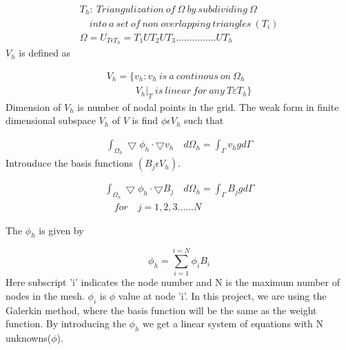 \documentclass[12pt]{elsarticle}
\begin{document}
	\begin{equation}
		\begin{gathered}
			T_h:\ Triangulization\ of\ \Omega\ by\ subdividing\ \Omega\\
			\quad into\ a\ set\ of\ non\ overlapping\ triangles\ (T_i)\\
			\Omega=U_{T\epsilon T_h}=T_1 U T_2 U T_3...............UT_h
		\end{gathered}
	\end{equation}
	$V_h$ is defined as 
	
	\begin{equation}
		\begin{gathered}
			V_h=\{v_h:v_h\ is\ a\ continous\ on\ \Omega_h \\
			\quad \quad \quad V_h|_T\ is\ linear\ for\ any\ T\varepsilon T_h \}
		\end{gathered}
	\end{equation}
	Dimension of $V_h$ is number of nodal points in the grid. The weak form in finite dimensional subspace $V_h$ of $V$
	is find $\phi \epsilon V_h$ such that 
	
	\begin{equation}
		\begin{gathered}
			\int_{{\Omega}_h} \bigtriangledown \phi_h \cdot \bigtriangledown v_h \quad d \Omega_h =\int_{\Gamma} v_h g d \Gamma
		\end{gathered}
	\end{equation}
	Introuduce the basis functions $(B_j \epsilon V_h)$.
	
	\begin{equation}
		\begin{gathered}
			\int_{{\Omega}_h} \bigtriangledown \phi_h \cdot \bigtriangledown B_j \quad d \Omega_h =\int_{\Gamma} B_j g d \Gamma \\ \quad for\quad  j=1,2,3......N
		\end{gathered}
	\end{equation}
	
	
	The $\phi_h$ is given by 
	
	\begin{equation}
		\phi_h=\sum\limits_{i=1}^{i=N} \phi_iB_i
	\end{equation}
	Here subscript 'i' indicates the node number and N is the maximum number of nodes in the mesh. $\phi_i$ is $\phi$ value at node 'i'. In this project, we are using the Galerkin method, where the basis function will be the same as the weight function. By introducing the $\phi_h$ we get a linear system of equations with N unknowns($\phi$).
	
\end{document}
